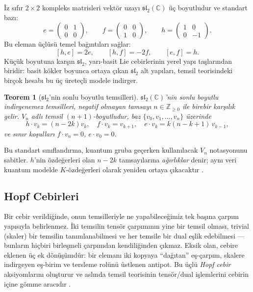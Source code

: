 \documentclass[10pt]{math}
\numberwithin{equation}{section}
\theoremstyle{plain}
\newtheorem{theorem}{Teorem}[section]
\theoremstyle{definition}
\renewcommand{\sl}{\mathfrak{sl}}
\newcommand{\C}{\mathbb{C}}
\newcommand{\Z}{\mathbb{Z}}
\begin{document}
İz sıfır $2 \times 2$ kompleks matrisleri vektör uzayı $\sl_2(\C)$ üç
boyutludur ve standart bazı:
\[
  e = \begin{pmatrix} 0 & 1 \\ 0 & 0 \end{pmatrix},\qquad
  f = \begin{pmatrix} 0 & 0 \\ 1 & 0 \end{pmatrix},\qquad
  h = \begin{pmatrix} 1 & 0 \\ 0 & -1 \end{pmatrix}.
\]
Bu eleman üçlüsü temel bağıntıları sağlar:
\begin{equation}\label{eq:sl2-rels}
  [h,e] = 2e, \qquad [h,f] = -2f, \qquad [e,f] = h.
\end{equation}
Küçük boyutuna karşın $\sl_2$, yarı-basit Lie cebirlerinin yerel yapı
taşlarından biridir: basit kökler boyunca ortaya çıkan $\sl_2$ alt yapıları,
temsil teorisindeki birçok hesabı bu üç üreteçli modele indirger.

\begin{theorem}[$\sl_2$'nin sonlu boyutlu temsilleri]
$\sl_2(\C)$'nin sonlu boyutlu indirgenemez temsilleri, negatif olmayan
tamsayı $n \in \Z_{\geq 0}$ ile birebir karşılık gelir. $V_n$ adlı temsil
$(n+1)$-boyutludur, baz $\{v_0, v_1, \dots, v_n\}$ üzerinde
\[
  h \cdot v_k = (n - 2k) v_k, \quad
  f \cdot v_k = v_{k+1}, \quad
  e \cdot v_k = k(n-k+1)\, v_{k-1},
\]
ve sınır koşulları $f \cdot v_n = 0$, $e \cdot v_0 = 0$.
\end{theorem}

Bu standart sınıflandırma, kuantum gruba geçerken kullanılacak $V_n$ notasyonunu
sabitler. $h$'nin özdeğerleri olan $n - 2k$ tamsayılarına \emph{ağırlıklar}
denir; aynı veri kuantum modelde $K$-özdeğerleri olarak yeniden ortaya çıkacaktır
\cite{ChariPressley}.

\subsection{Hopf Cebirleri}

Bir cebir verildiğinde, onun temsilleriyle ne yapabileceğimiz tek başına çarpım
yapısıyla belirlenmez. İki temsilin tensör çarpımının yine bir temsil olması,
trivial (skaler) bir temsilin tanımlanabilmesi ve her temsile bir dual
eşlik edebilmesi --- bunların hiçbiri birleşmeli çarpımdan kendiliğinden çıkmaz.
Eksik olan, cebire eklenen üç ek dönüşümdür: bir elemanı iki kopyaya ``dağıtan''
eş-çarpım, skalere indirgeyen eş-birim ve tersleme rolünü üstlenen antipot. Bu
üçlü \emph{Hopf cebir} aksiyomlarını oluşturur ve aslında temsil teorisinin
tensör/dual işlemlerini cebirin içine gömme aracıdır \cite{Kassel}.
\end{document}
